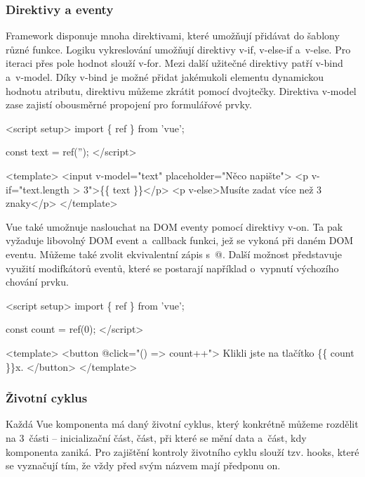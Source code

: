 \subsubsection{Direktivy a eventy}

Framework disponuje mnoha direktivami, které umožňují přidávat do šablony různé funkce. Logiku vykreslování umožňují direktivy v-if, v-else-if a~v-else. 
Pro iteraci přes pole hodnot slouží v-for. Mezi další užitečné direktivy patří v-bind a~v-model. 
Díky v-bind je možné přidat jakémukoli elementu dynamickou hodnotu atributu, direktivu můžeme zkrátit pomocí dvojtečky. 
Direktiva v-model zase zajistí obousměrné propojení pro formulářové prvky.

\begin{prog}
<script setup>
  import \{ ref \} from 'vue';

  const text = ref('');
</script>

<template>
  <input v-model="text" placeholder="Něco napište">
  <p v-if="text.length > 3">\{\{ text \}\}</p>
  <p v-else>Musíte zadat více než 3 znaky</p>
</template> 
\end{prog}

Vue také umožnuje naslouchat na DOM eventy pomocí direktivy v-on. Ta pak vyžaduje libovolný DOM event a~callback funkci, jež se vykoná při daném DOM eventu. 
Můžeme také zvolit ekvivalentní zápis s~@. Další možnost představuje využití modifkátorů eventů, které se postarají například o~vypnutí výchozího chování prvku.\cite{vuemacrae,vue}

\begin{prog}
<script setup>
  import \{ ref \} from 'vue';

  const count = ref(0);
</script>

<template>
  <button @click="() => count++">
    Klikli jste na tlačítko \{\{ count \}\}x.
  </button>
</template>
\end{prog}

\subsubsection{Životní cyklus}

Každá Vue komponenta má daný životní cyklus, který konkrétně můžeme rozdělit na 3~části -- inicializační část, část, při které se mění data a~část, kdy komponenta zaniká. 
Pro zajištění kontroly životního cyklu slouží tzv. hooks, které se vyznačují tím, že vždy před svým názvem mají předponu on.

